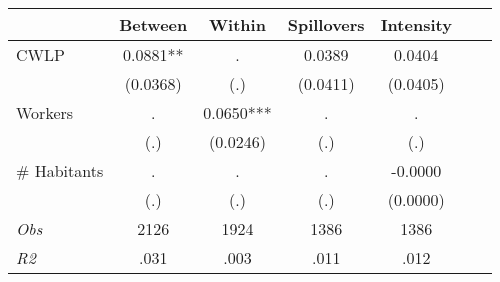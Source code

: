 \begin{tabular}{l*{6}{c}}\hline&\multicolumn{1}{c}{Between}&\multicolumn{1}{c}{Within}&\multicolumn{1}{c}{Spillovers}&\multicolumn{1}{c}{Intensity}\\ \hline 
CWLP & 0.0881** & . & 0.0389 & 0.0404 \\
 & (0.0368) & (.) & (0.0411) & (0.0405) \\
Workers & . & 0.0650*** & . & . \\
 & (.) & (0.0246) & (.) & (.) \\
\# Habitants & . & . & . & -0.0000 \\
  & (.) & (.) & (.) & (0.0000) \\
\hline \textit{Obs} & 2126 & 1924 & 1386 & 1386  \\ \textit{R2} & .031 & .003 & .011 & .012 \\ \hline \end{tabular}
